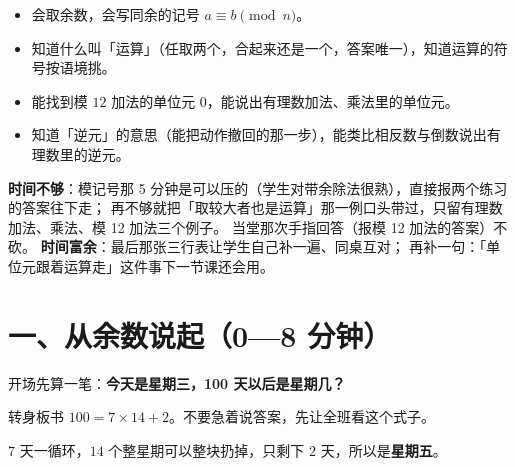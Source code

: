 

\begin{mubiao}
  \begin{itemize}
    \item 会取余数，会写同余的记号 \(a\equiv b\pmod n\)。
    \item 知道什么叫「运算」（任取两个，合起来还是一个，答案唯一），知道运算的符号按语境挑。
    \item 能找到模 \(12\) 加法的单位元 \(0\)，能说出有理数加法、乘法里的单位元。
    \item 知道「逆元」的意思（能把动作撤回的那一步），能类比相反数与倒数说出有理数里的逆元。
  \end{itemize}
\end{mubiao}


\begin{beifen}
  \textbf{时间不够}：模记号那 5 分钟是可以压的（学生对带余除法很熟），直接报两个练习的答案往下走；
  再不够就把「取较大者也是运算」那一例口头带过，只留有理数加法、乘法、模 12 加法三个例子。
  当堂那次手指回答（报模 12 加法的答案）不砍。
  \textbf{时间富余}：最后那张三行表让学生自己补一遍、同桌互对；
  再补一句：「单位元跟着运算走」这件事下一节课还会用。
\end{beifen}

\section*{一、从余数说起（0—8 分钟）}

开场先算一笔：\textbf{今天是星期三，100 天以后是星期几？}

\begin{caozuo}
  转身板书 \(100=7\times14+2\)。不要急着说答案，先让全班看这个式子。
\end{caozuo}

\(7\) 天一循环，\(14\) 个整星期可以整块扔掉，只剩下 \(2\) 天，所以是\textbf{星期五}。

